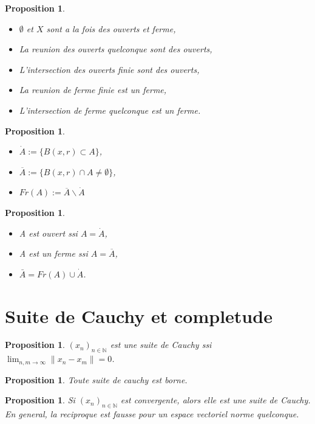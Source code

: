 \documentclass[a4paper, 12pt, french]{report}
\theoremstyle{break}
\newtheorem{prop}[defin]{Proposition}
\begin{document}
\begin{prop}
    \begin{itemize}
        \item $\emptyset$ et $X$ sont a la fois des ouverts et ferme,
        \item La reunion des ouverts quelconque sont des ouverts,
        \item L'intersection des ouverts finie sont des ouverts,
        \item La reunion de ferme finie est un ferme,
        \item L'intersection de ferme quelconque est un ferme.
    \end{itemize}
\end{prop}

\begin{prop}
    \begin{itemize}
        \item $\dot{A} := \{ B(x,r) \subset A\}$,
        \item $\overline{A} := \{ B(x,r) \cap A \not= \emptyset\}$,
        \item $Fr(A) := \overline{A} \backslash \dot{A}$
    \end{itemize}
\end{prop}

\begin{prop}
    \begin{itemize}
        \item A est ouvert ssi $A=\dot{A}$,
        \item A est un ferme ssi $A=\overline{A}$,
        \item $\bar{A} = Fr(A) \cup \dot{A}$.
    \end{itemize}
\end{prop}

\section{Suite de Cauchy et completude}
\begin{prop}
    $(x_{n})_{n \in \mathbb{N}}$ est une suite de Cauchy ssi $ \displaystyle \lim_{n, m \rightarrow \infty} \| x_{n} - x_{m}\| = 0$.
\end{prop}

\begin{prop}
    Toute suite de cauchy est borne.
\end{prop}

\begin{prop}
    Si $(x_{n})_{n \in \mathbb{N}}$ est convergente, alors elle est une suite de Cauchy.\\ En general, la reciproque est fausse pour un espace vectoriel norme quelconque.
\end{prop}
\end{document}
